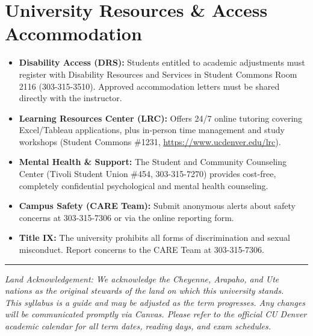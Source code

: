 \documentclass[11pt,a4paper]{article}
\begin{document}
\section*{University Resources \& Access Accommodation}
\begin{itemize}[leftmargin=*]
    \item \textbf{Disability Access (DRS):} Students entitled to academic adjustments must register with Disability Resources and Services in Student Commons Room 2116 (303-315-3510). Approved accommodation letters must be shared directly with the instructor.
    \item \textbf{Learning Resources Center (LRC):} Offers 24/7 online tutoring covering Excel/Tableau applications, plus in-person time management and study workshops (Student Commons \#1231, \url{https://www.ucdenver.edu/lrc}).
    \item \textbf{Mental Health \& Support:} The Student and Community Counseling Center (Tivoli Student Union \#454, 303-315-7270) provides cost-free, completely confidential psychological and mental health counseling.
    \item \textbf{Campus Safety (CARE Team):} Submit anonymous alerts about safety concerns at 303-315-7306 or via the online reporting form.
    \item \textbf{Title IX:} The university prohibits all forms of discrimination and sexual misconduct. Report concerns to the CARE Team at 303-315-7306.
\end{itemize}

\vfill
\noindent\rule{\textwidth}{0.4pt}
\small
\textit{Land Acknowledgement: We acknowledge the Cheyenne, Arapaho, and Ute nations as the original stewards of the land on which this university stands.}\\
\textit{This syllabus is a guide and may be adjusted as the term progresses. Any changes will be communicated promptly via Canvas. Please refer to the official CU Denver academic calendar for all term dates, reading days, and exam schedules.}
\end{document}
